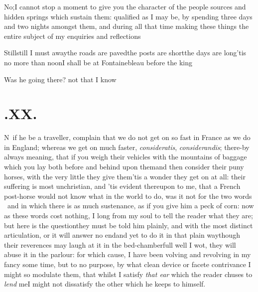 \documentclass{article}
\begin{document}
\tsk No;\tsk I cannot stop a moment to give you the character of the people\break
{}
\break
sources and hidden springs which sustain them: qualified as I may be, by spending
three days and two nights amongst them, and during all that time making these things
the entire subject of my enquiries and reflections\tsh{}

Still\tsk still I must away\tsh the roads are paved\tsk the posts are short\tsk the days
are long\tsk ’tis no more than noon\tsk I shall be at Fontainebleau before the king\tsh

\tsh Was he going there? not that I know\tsh

\section{.\enspace XX.}

\lettrine{N}{\, }\break
if he be a traveller, complain that\break
we do not get on so fast in France as we\break
do in England; whereas we get on much\break
faster, \textit{consideratis}, \textit{considerandis}; there-\break by always meaning, that if you
weigh their vehicles with the mountains of baggage which you lay both before and
behind upon them\tsk and then consider their puny horses, with the very little
they
give them\tsk ’tis a wonder they get on at all: their suffering
is most unchristian,\break
and ’tis evident thereupon to me, that a
French post-horse would not know what
in the world to do, was it not for the
two words \astvi\ and \astvi\break
in which there is as
much sustenance, as if you give him a peck of corn: now as these
words cost nothing, I long from my soul to tell the reader what
they are; but here is the question\tsk they must be told him
plainly, and with the most distinct articulation, or it will
answer no end\tsk and yet to do it in that plain way\tsk though
their reverences may laugh at it in the bed-chamber\tsk full
well I wot, they will abuse it in the parlour: for which cause,
I have been volving and revolving in my fancy some time, but to no
purpose, by what clean device or facete contrivance I might
so modulate them, that whilst I satisfy \textit{that ear} which
the reader chuses to \textit{lend} me\tsk I might not dissatisfy
the other which he keeps to himself.
\end{document}
